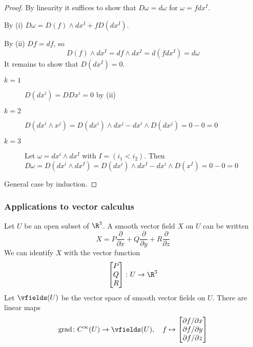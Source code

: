 \begin{frame}
  \begin{proof}
    By linearity it suffices to show that $D \omega = d \omega$
    for $\omega = fdx^I$.

    By (i) $D\omega = D(f) \wedge dx^I + fD(dx^I)$.

    By (ii) $D f = df$, so
    \begin{displaymath}
      D(f) \wedge dx^I = df \wedge dx^I = d(f dx^I) = d\omega
    \end{displaymath}
    It remains to show that $D(dx^I) = 0$.
    \begin{description}
      \item[$k=1$] $D(dx^i) = DDx^i = 0$ by (ii)
      \item[$k=2$] $D(dx^i \wedge x^j) = D(dx^i)\wedge dx^j
        - dx^i \wedge D(dx^j) = 0 - 0 = 0$
      \item[$k=3$] Let $\omega = dx^i \wedge dx^I$ with $I = (i_1 < i_2)$.
        Then $D\omega = D(dx^i \wedge dx^I) = D(dx^i) \wedge dx^I
        - dx^i \wedge D(x^I) = 0 - 0 = 0$
    \end{description}
    General case by induction.
  \end{proof}
\end{frame}
\begin{frame}
  \frametitle{Applications to vector calculus}
  Let $U$ be an open subset of $\R^3$.
  A smooth vector field $X$ on $U$ can be written
  \begin{displaymath}
    X =
    P \frac{\partial}{\partial x}
    +
    Q \frac{\partial}{\partial y}
    +
    R \frac{\partial}{\partial z}
  \end{displaymath}
  We can identify $X$ with the vector function 
  \begin{displaymath}
    \begin{bmatrix}
      P \\ Q \\ R
    \end{bmatrix}
    \colon U \to \R^3
  \end{displaymath}
  Let $\vfields(U)$ be the vector space of smooth vector fields on $U$.
  There are linear maps
  \begin{displaymath}
    \operatorname{grad} \colon C^{\infty}(U) \to \vfields(U), \quad f \mapsto 
    \begin{bmatrix}
      {\partial f} / {\partial x} \\
      {\partial f} / {\partial y} \\
      {\partial f} / {\partial z} \\
    \end{bmatrix}
  \end{displaymath}
\end{frame}
